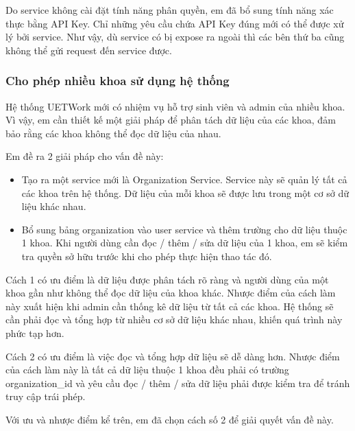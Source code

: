\documentclass[./../main.tex]{subfiles}
\begin{document}
Do service không cài đặt tính năng phân quyền, em đã bổ sung tính năng
xác thực bằng API Key. Chỉ những yêu cầu chứa API Key đúng mới có thể
được xử lý bởi service. Như vậy, dù service có bị expose ra ngoài thì
các bên thứ ba cũng không thể gửi request đến service được.

\hypertarget{cho-phuxe9p-nhiux1ec1u-khoa-sux1eed-dux1ee5ng-hux1ec7-thux1ed1ng}{%
\subsubsection{Cho phép nhiều khoa sử dụng hệ
thống}\label{cho-phuxe9p-nhiux1ec1u-khoa-sux1eed-dux1ee5ng-hux1ec7-thux1ed1ng}}

Hệ thống UETWork mới có nhiệm vụ hỗ trợ sinh viên và admin của nhiều
khoa. Vì vậy, em cần thiết kế một giải pháp để phân tách dữ liệu của các
khoa, đảm bảo rằng các khoa không thể đọc dữ liệu của nhau.

Em đề ra 2 giải pháp cho vấn đề này:

\begin{itemize}
\item
  
  Tạo ra một service mới là Organization Service. Service này sẽ quản lý
  tất cả các khoa trên hệ thống. Dữ liệu của mỗi khoa sẽ được lưu trong
  một cơ sở dữ liệu khác nhau.
  
\item
  
  Bổ sung bảng organization vào user service và thêm trường
   cho dữ liệu thuộc 1 khoa. Khi người dùng cần đọc /
  thêm / sửa dữ liệu của 1 khoa, em sẽ kiểm tra quyền sở hữu trước khi
  cho phép thực hiện thao tác đó.
  
\end{itemize}

Cách 1 có ưu điểm là dữ liệu được phân tách rõ ràng và người dùng của
một khoa gần như không thể đọc dữ liệu của khoa khác. Nhược điểm của
cách làm này xuất hiện khi admin cần thống kê dữ liệu từ tất cả các
khoa. Hệ thống sẽ cần phải đọc và tổng hợp từ nhiều cơ sở dữ liệu khác
nhau, khiến quá trình này phức tạp hơn.

Cách 2 có ưu điểm là việc đọc và tổng hợp dữ liệu sẽ dễ dàng hơn. Nhược
điểm của cách làm này là tất cả dữ liệu thuộc 1 khoa đều phải có trường
organization\_id và yêu cầu đọc / thêm / sửa dữ liệu phải được kiểm tra
để tránh truy cập trái phép.

Với ưu và nhược điểm kể trên, em đã chọn cách số 2 để giải quyết vấn đề
này.
\end{document}
